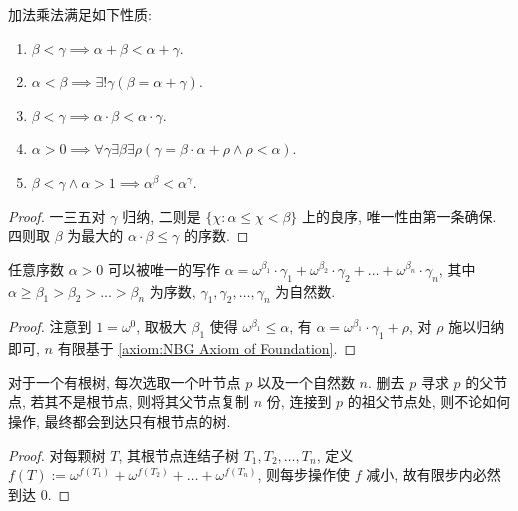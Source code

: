 \begin{lemma}
    加法乘法满足如下性质:

    \begin{enumerate}
        \item \(\beta < \gamma \implies \alpha + \beta < \alpha + \gamma\).
        \item \(\alpha < \beta \implies \exists ! \gamma (\beta = \alpha + \gamma)\).
        \item \(\beta < \gamma \implies \alpha \cdot \beta < \alpha \cdot \gamma\).
        \item \(\alpha > 0 \implies \forall \gamma \exists \beta \exists \rho (\gamma = \beta \cdot \alpha + \rho \land \rho < \alpha)\).
        \item \(\beta < \gamma \land \alpha > 1 \implies \alpha^\beta < \alpha^\gamma\).
    \end{enumerate}

    \begin{proof}
        一三五对 \(\gamma\) 归纳, 二则是 \(\{\chi : \alpha \le \chi < \beta\}\) 上的良序, 唯一性由第一条确保.
        四则取 \(\beta\) 为最大的 \(\alpha \cdot \beta \le \gamma\) 的序数.
    \end{proof}
\end{lemma}

\begin{theorem}
    [Cantor] 任意序数 \(\alpha > 0\) 可以被唯一的写作
    \(\alpha = \omega^{\beta_1} \cdot \gamma_1 + \omega^{\beta_2} \cdot \gamma_2 + \dots + \omega^{\beta_n} \cdot \gamma_n\),
    其中 \(\alpha \ge \beta_1 > \beta_2 > \dots > \beta_n\) 为序数, \(\gamma_1, \gamma_2, \dots, \gamma_n\) 为自然数.

    \begin{proof}
        注意到 \(1 = \omega^0\), 取极大 \(\beta_1\) 使得 \(\omega^{\beta_1} \le \alpha\), 有 \(\alpha = \omega^{\beta_1} \cdot \gamma_1 + \rho\),
        对 \(\rho\) 施以归纳即可, \(n\) 有限基于 \ref{axiom:NBG Axiom of Foundation}.
    \end{proof}
\end{theorem}

\begin{example}
    [Hydra 数] 对于一个有根树, 每次选取一个叶节点 \(p\) 以及一个自然数 \(n\).
    删去 \(p\) 寻求 \(p\) 的父节点, 若其不是根节点, 则将其父节点复制 \(n\) 份,
    连接到 \(p\) 的祖父节点处, 则不论如何操作, 最终都会到达只有根节点的树.

    \begin{proof}
        对每颗树 \(T\), 其根节点连结子树 \(T_1, T_2, \dots, T_n\), 定义 \(f(T) := \omega^{f(T_1)} + \omega^{f(T_2)} + \dots + \omega^{f(T_n)}\),
        则每步操作使 \(f\) 减小, 故有限步内必然到达 \(0\).
    \end{proof}
\end{example}

